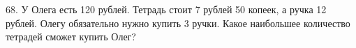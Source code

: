 68. У Олега есть 120 рублей. Тетрадь стоит 7 рублей 50 копеек, а ручка 12 рублей. Олегу обязательно нужно купить 3 ручки. Какое наибольшее количество тетрадей сможет купить Олег?\\
